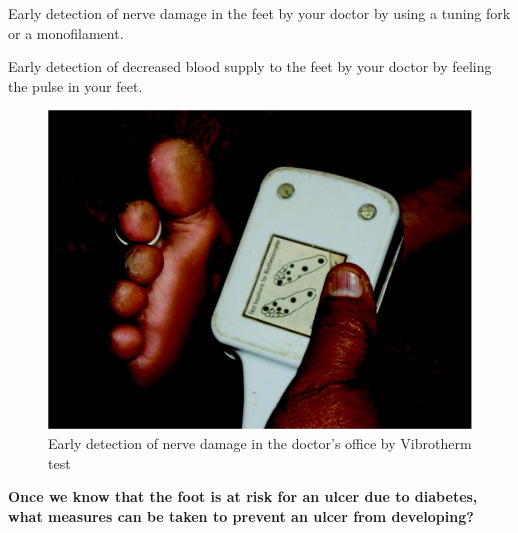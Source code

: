  \item Early detection of nerve damage in the feet by your doctor by using a tuning fork or a monofilament.

 \item Early detection of decreased blood supply to the feet by your doctor by feeling the pulse in your feet.


\begin{figure}
\includegraphics{images/063.jpg}
\caption{Early detection of nerve damage in the doctor's office by Vibrotherm test}
\end{figure}

\textbf{Once we know that the foot is at risk for an ulcer due to diabetes, what measures can be taken to prevent an ulcer from developing?}

